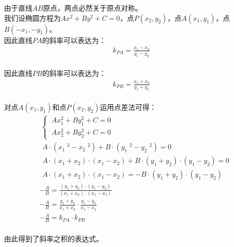 \documentclass[UTF8]{ctexart}
\begin{document}
    由于直线$AB$原点，两点必然关于原点对称。\\[3mm]
    我们设椭圆方程为$Ax^2+By^2+C=0$，点$P(x_2,y_2)$，点$A(x_1,y_1)$，点$B(-x_1,-y_1)$。\\[3mm]
    因此直线$PA$的斜率可以表达为：
    \begin{align}
        k_{PA}=\frac{x_1-x_2}{y_1-y_2}
    \end{align}\\
    因此直线$PB$的斜率可以表达为：
    \begin{align}
        k_{PB}=\frac{x_1+x_2}{y_1+y_2}
    \end{align}\\
    对点$A(x_1,y_1)$和点$P(x_2,y_2)$运用点差法可得：\vspace{5pt}
    \begin{align}
        &~\begin{cases}
            ~Ax_1^2+By_1^2+C=0\\[1mm]
            ~Ax_2^2+By_2^2+C=0
        \end{cases}\\[8mm]
        &~~A\cdot\left(x_1\;^2-x_2\;^2\right)+B\cdot\left(y_1\;^2-y_2\;^2\right)=0\\[8mm]
        &~~A\cdot(x_1+x_2)\cdot(x_1-x_2)+B\cdot(y_1+y_2)\cdot(y_1-y_2)=0\\[8mm]
        &~~A\cdot(x_1+x_2)\cdot(x_1-x_2)=-B\cdot(y_1+y_2)\cdot(y_1-y_2)\\[8mm]
        &-\frac{A}{B}=\frac{(y_1+y_2)\cdot(y_1-y_2)}{(x_1+x_2)\cdot(x_1-x_2)}\\[8mm]
        &-\frac{A}{B}=\frac{y_1+y_2}{x_1+x_2}\cdot\frac{y_1-y_2}{x_1-x_2}\\[8mm]
        &-\frac{A}{B}=k_{PA}\cdot k_{PB}
    \end{align}\\
    由此得到了斜率之积的表达式。

\newpage
\end{document}
